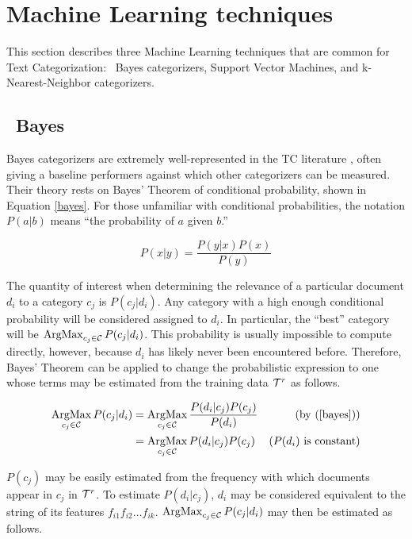 \section{Machine Learning techniques}
\label{machine-learning}

This section describes three Machine Learning techniques that are
common for Text Categorization: \naive\ Bayes categorizers, Support
Vector Machines, and k-Nearest-Neighbor categorizers.

\subsection{\naive\ Bayes}

\naive Bayes categorizers are extremely well-represented in the TC
literature \cite{lewis:98,yang:99,sebastiani:02}, often giving a
baseline performers against which other categorizers can be measured.
Their theory rests on Bayes' Theorem of conditional probability, shown
in Equation \ref{bayes}.  For those unfamiliar with conditional
probabilities, the notation $P(a|b)$ means ``the probability of $a$
given $b$.''

\begin{equation} \label{bayes}
P(x|y) = \frac{P(y|x) P(x)}{P(y)}
\end{equation}

The quantity of interest when determining the relevance of a
particular document $d_i$ to a category $c_j$ is $P(c_j|d_i)$.  Any
category with a high enough conditional probability will be considered
assigned to $d_i$.  In particular, the ``best'' category will be
$\operatorname*{ArgMax}_{c_j\in\mathcal{C}} P(c_j|d_i)$. This probability is usually impossible to
compute directly, however, because $d_i$ has likely never been
encountered before.  Therefore, Bayes' Theorem can be applied to
change the probabilistic expression to one whose terms may be
estimated from the training data $\mathcal{T}^r$ as follows.

\begin{align*}
\operatorname*{ArgMax}_{c_j\in\mathcal{C}} P(c_j|d_i) 
 & = \operatorname*{ArgMax}_{c_j\in\mathcal{C}} \frac{P(d_i|c_j) P(c_j)}{P(d_i)} & (\text{by (\ref{bayes})}) \\
 & = \operatorname*{ArgMax}_{c_j\in\mathcal{C}} P(d_i|c_j) P(c_j) & (P(d_i) \text{ is constant}) \\
\end{align*}

$P(c_j)$ may be easily estimated from the frequency with which
documents appear in $c_j$ in $\mathcal{T}^r$.  To estimate $P(d_i|c_j)$,
$d_i$ may be considered equivalent to the string of its features
$f_{i1} f_{i2} \ldots f_{ik}$.  $\operatorname*{ArgMax}_{c_j\in\mathcal{C}} P(c_j|d_i)$ may
then be estimated as follows.

